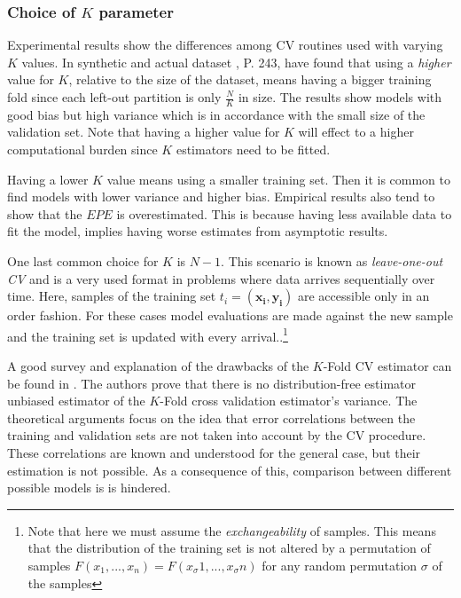 \subsubsection{Choice of $K$ parameter}

Experimental results show the differences among CV routines used with varying $K$ values. In synthetic and actual dataset , \textcite{hastie-elemstatslearn} P. 243, have found that using a \textit{higher} value for $K$, relative to the size of the dataset, means having a bigger training fold since each left-out partition is only $\frac{N}{K}$ in size. The results show models with good bias but high variance which is in accordance with the small size of the validation set. Note that having a higher value for $K$ will effect to a higher computational burden since $K$ estimators need to be fitted.

Having a lower $K$ value means using a smaller training set. Then it is common to find models with lower variance and higher bias. Empirical results also tend to show that the $EPE$ is overestimated. This is because having less available data to fit the model, implies having worse estimates from asymptotic results.

One last common choice for $K$ is $N-1$. This scenario is known as \textit{leave-one-out CV} and is a very used format in problems where data arrives sequentially over time. Here, samples of the training set $t_i = ( \boldsymbol{x_i} , \boldsymbol{y_i} )$ are accessible only in an order fashion. For these cases model evaluations are made against the new sample and the training set is updated with every arrival..\footnote{Note that here we must assume the \textit{exchangeability} of samples. This means that the distribution of the training set is not altered by a permutation of samples $F(x_1,...,x_n ) = F(x_\sigma{1},...,x_\sigma{n})$ for any random permutation $\sigma$ of the samples  }


A good survey and explanation of the drawbacks of the $K$-Fold CV estimator can be found in \textcite{bengio-unbiasedCvEstimator}. The authors prove that there is no distribution-free estimator unbiased estimator of the $K$-Fold cross validation estimator's variance. The theoretical arguments focus on the idea that error correlations between the training and validation sets are not taken into account by the CV procedure. These correlations are known and understood for the general case, but their estimation is not possible. As a consequence of this, comparison between different possible models is is hindered.

